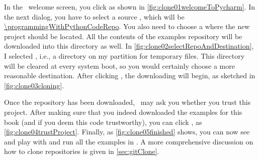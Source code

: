 \begin{sloppypar}%
In the \pycharm\ welcome screen, you click  as shown in \cref{fig:clone01welcomeToPycharm}.
In the next dialog, you have to select a source , which will be \expandafter\url{\programmingWithPythonCodeRepo}.
You also need to choose a  where the new project should be located.
All the contents of the examples repository will be downloaded into this directory as well.
In \cref{fig:clone02selectRepoAndDestination}, I selected , i.e., a directory on my partition for temporary files.
This directory will be cleared at every system boot, so you would certainly choose a more reasonable destination.
After clicking , the downloading will begin, as sketched in \cref{fig:clone03cloning}.%
\end{sloppypar}%
%
Once the repository has been downloaded, \pycharm\ may ask you whether you trust this project.
After making sure that you indeed downloaded the examples for this book (and if you deem this code trustworthy), you can click , as \cref{fig:clone04trustProject}.
Finally, as \cref{fig:clone05finished} shows, you can now see and play with and run all the examples in \pycharm.
A more comprehensive discussion on how to clone repositories is given in \cref{sec:gitClone}.%
%
\FloatBarrier%
\endhsection%
%
